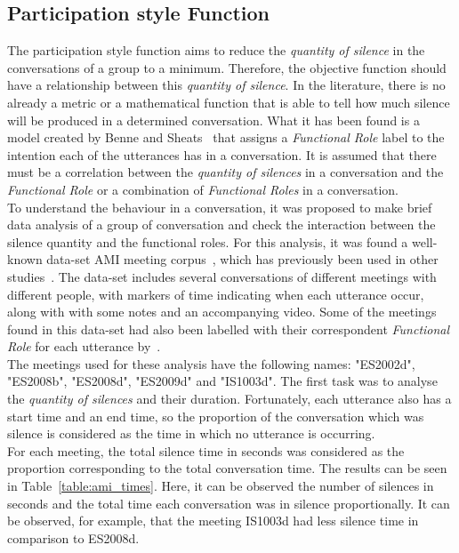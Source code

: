 \subsection{Participation style Function}

The participation style function aims to reduce the \textit{quantity of silence} in the conversations of a group to a minimum. Therefore, the objective function should have a relationship between this \textit{quantity of silence}. In the literature, there is no already a metric or a mathematical function that is able to tell how much silence will be produced in a determined conversation. What it has been found is a model created by Benne and Sheats~\cite{FunctionalRoles} that assigns a \textit{Functional Role} label to the intention each of the utterances has in a conversation. It is assumed that there must be a correlation between the \textit{quantity of silences} in a conversation and the \textit{Functional Role} or a combination of \textit{Functional Roles} in a conversation.\\

To understand the behaviour in a conversation, it was proposed to make brief data analysis of a group of conversation and check the interaction between the silence quantity and the functional roles. For this analysis, it was found a well-known data-set AMI meeting corpus~\cite{mccowan2005ami}, which has previously been used in other studies~\cite{dong2012modeling, Matsuyama2015Four-participantParticipant}. The data-set includes several conversations of different meetings with different people, with markers of time indicating when each utterance occur, along with with some notes and an accompanying video. Some of the meetings found in this data-set had also been labelled with their correspondent \textit{Functional Role} for each utterance by~\cite{dong2012modeling}.\\

The meetings used for these analysis have the following names: "ES2002d", "ES2008b", "ES2008d", "ES2009d" and "IS1003d". The first task was to analyse the \textit{quantity of silences} and their duration. Fortunately, each utterance also has a start time and an end time, so the proportion of the conversation which was silence is considered as the time in which no utterance is occurring.\\

For each meeting, the total silence time in seconds was considered as the proportion corresponding to the total conversation time. The results can be seen in Table~\ref{table:ami_times}. Here, it can be observed the number of silences in seconds and the total time each conversation was in silence proportionally. It can be observed, for example, that the meeting IS1003d had less silence time in comparison to ES2008d.\\

